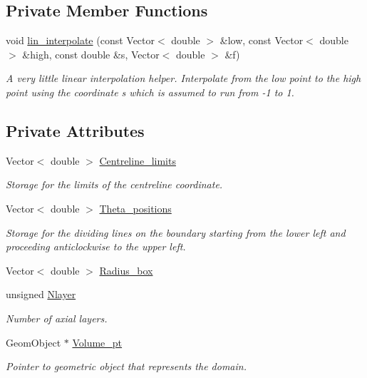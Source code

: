 \subsection*{Private Member Functions}
\begin{DoxyCompactItemize}
\item 
void \hyperlink{classoomph_1_1TubeDomain_a4e893ffe544f30d0160c41b2aff75d7f}{lin\+\_\+interpolate} (const Vector$<$ double $>$ \&low, const Vector$<$ double $>$ \&high, const double \&s, Vector$<$ double $>$ \&f)
\begin{DoxyCompactList}\small\item\em A very little linear interpolation helper. Interpolate from the low point to the high point using the coordinate s which is assumed to run from -\/1 to 1. \end{DoxyCompactList}\end{DoxyCompactItemize}
\subsection*{Private Attributes}
\begin{DoxyCompactItemize}
\item 
Vector$<$ double $>$ \hyperlink{classoomph_1_1TubeDomain_a472cea9a87841cc70a3b8a65e87f6aff}{Centreline\+\_\+limits}
\begin{DoxyCompactList}\small\item\em Storage for the limits of the centreline coordinate. \end{DoxyCompactList}\item 
Vector$<$ double $>$ \hyperlink{classoomph_1_1TubeDomain_a893b7c0f20f3971948bf4ab04d3fe182}{Theta\+\_\+positions}
\begin{DoxyCompactList}\small\item\em Storage for the dividing lines on the boundary starting from the lower left and proceeding anticlockwise to the upper left. \end{DoxyCompactList}\item 
Vector$<$ double $>$ \hyperlink{classoomph_1_1TubeDomain_ad70a97648fd496d9f5322e122ef907e4}{Radius\+\_\+box}
\item 
unsigned \hyperlink{classoomph_1_1TubeDomain_a76d77b0dde9979a92e88d3d0143bf114}{Nlayer}
\begin{DoxyCompactList}\small\item\em Number of axial layers. \end{DoxyCompactList}\item 
Geom\+Object $\ast$ \hyperlink{classoomph_1_1TubeDomain_a6dd70d59e8cd65e44444f78fbfa1f97a}{Volume\+\_\+pt}
\begin{DoxyCompactList}\small\item\em Pointer to geometric object that represents the domain. \end{DoxyCompactList}\end{DoxyCompactItemize}


